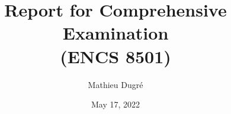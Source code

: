 \documentclass{report}
\title{Report for Comprehensive Examination\\(ENCS 8501)}
\author{Mathieu Dugr\'e}
\date{May 17, 2022}
\begin{document}

\begin{titlepage}
	\maketitle 
	\thispagestyle{empty}
\end{titlepage}

\tableofcontents

\clearpage
{}









\end{document}
